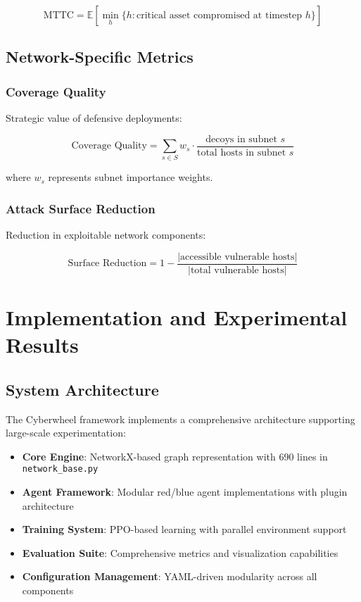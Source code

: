 \documentclass[11pt]{article}
\theoremstyle{definition}
\theoremstyle{plain}
\newcommand{\EE}{\mathbb{E}}
\begin{document}
\begin{equation}
\text{MTTC} = \EE\left[\min_h \{h : \text{critical asset compromised at timestep } h\}\right]
\end{equation}

\subsection{Network-Specific Metrics}

\subsubsection{Coverage Quality}
Strategic value of defensive deployments:

\begin{equation}
\text{Coverage Quality} = \sum_{s \in S} w_s \cdot \frac{\text{decoys in subnet } s}{\text{total hosts in subnet } s}
\end{equation}

where $w_s$ represents subnet importance weights.

\subsubsection{Attack Surface Reduction}
Reduction in exploitable network components:

\begin{equation}
\text{Surface Reduction} = 1 - \frac{|\text{accessible vulnerable hosts}|}{|\text{total vulnerable hosts}|}
\end{equation}

\section{Implementation and Experimental Results}

\subsection{System Architecture}

The Cyberwheel framework implements a comprehensive architecture supporting large-scale experimentation:

\begin{itemize}
    \item \textbf{Core Engine}: NetworkX-based graph representation with 690 lines in \texttt{network\_base.py}
    \item \textbf{Agent Framework}: Modular red/blue agent implementations with plugin architecture
    \item \textbf{Training System}: PPO-based learning with parallel environment support
    \item \textbf{Evaluation Suite}: Comprehensive metrics and visualization capabilities
    \item \textbf{Configuration Management}: YAML-driven modularity across all components
\end{itemize}
\end{document}
